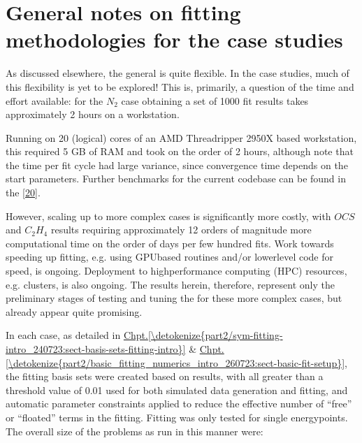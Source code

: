 \documentclass[letterpaper,table,10pt,english]{jupyterBook}
\begin{document}
\section{General notes on fitting methodologies for the case studies}
\label{\detokenize{part2/case-study-summaries_240723:general-notes-on-fitting-methodologies-for-the-case-studies}}
\sphinxAtStartPar
As discussed elsewhere, the general {\hyperref[\detokenize{backmatter/glossary:term-bootstrap-retrieval-protocol}]{}} is quite flexible. In the case studies, much of this flexibility is yet to be explored! This is, primarily, a question of the time and effort available: for the \(N_2\) case obtaining a set of 1000 fit results takes approximately 2 hours on a workstation.%
\begin{footnote}[1]\sphinxAtStartFootnote
Running on 20 (logical) cores of an AMD Threadripper 2950X based workstation, this required 5 GB of RAM and took on the order of 2 hours, although note that the time per fit cycle had large variance, since convergence time depends on the start parameters. Further benchmarks for the current codebase can be found in the  {[}\hyperlink{cite.backmatter/bibliography:id681}{20}{]}.
%
\end{footnote} However, scaling up to more complex cases is significantly more costly, with \(OCS\) and \(C_2H_4\) results requiring approximately 1\sphinxhyphen{}2 orders of magnitude more computational time \sphinxhyphen{} on the order of days per few hundred fits. Work towards speeding up fitting, e.g. using GPU\sphinxhyphen{}based routines and/or lower\sphinxhyphen{}level code for speed, is ongoing. Deployment to high\sphinxhyphen{}performance computing (HPC) resources, e.g. clusters, is also ongoing. The results herein, therefore, represent only the preliminary stages of testing and tuning the {\hyperref[\detokenize{backmatter/glossary:term-bootstrap-retrieval-protocol}]{}} for these more complex cases, but already appear quite promising.

\sphinxAtStartPar
In each case, as detailed in \hyperref[\detokenize{part2/sym-fitting-intro_240723:sect-basis-sets-fitting-intro}]{Chpt.\@ \ref{\detokenize{part2/sym-fitting-intro_240723:sect-basis-sets-fitting-intro}}} \& \hyperref[\detokenize{part2/basic_fitting_numerics_intro_260723:sect-basic-fit-setup}]{Chpt.\@ \ref{\detokenize{part2/basic_fitting_numerics_intro_260723:sect-basic-fit-setup}}}, the fitting basis sets were created based on  results, with all {\hyperref[\detokenize{backmatter/glossary:term-radial-matrix-elements}]{}} greater than a threshold value of 0.01 used for both simulated data generation and fitting, and automatic parameter constraints applied to reduce the effective number of “free” or “floated” terms in the fitting. Fitting was only tested for single energy\sphinxhyphen{}points. The overall size of the problems as run in this manner were:
\end{document}
